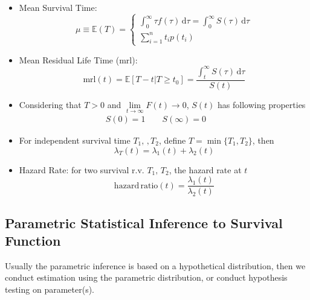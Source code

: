 \begin{itemize}[topsep=2pt,itemsep=0pt]
    \item Mean Survival Time:
    \begin{equation}
        \mu \equiv\mathbb{E}(T)=\begin{cases}
            \int _{0}^\infty \tau f(\tau) \,\mathrm{d}\tau =\int _0^\infty S(\tau) \,\mathrm{d}\tau\\
            \sum_{i=1}^nt_ip(t_i) 
        \end{cases}
    \end{equation}
    
    
    \item Mean Residual Life Time ($ \mathrm{mrl}  $):
    \begin{equation}
        \mathrm{mrl}(t)=\mathbb{E}[T-t|T\geq t_0]=\dfrac{\int _t^\infty S(\tau) \,\mathrm{d}\tau}{S(t)}  
    \end{equation}
    
    \item Considering that $ T>0 $ and $ \lim\limits_{t\to\infty}F(t)\to 0 $, $ S(t) $ has following properties
    \begin{align}
        S(0)=1\qquad S(\infty)=0\qquad
    \end{align}
    \item For independent survival time $ T_1,\,,T_2 $, define $ T=\min\{T_1,T_2\} $, then 
    \begin{equation}
        \lambda _T(t)=\lambda _1(t)+\lambda _2 (t)
    \end{equation}
    \item Hazard Rate: for two survival r.v. $ T_1,\,T_2 $, the hazard rate at $ t $
    \begin{equation}
        \mathrm{hazard\,ratio}(t)=\dfrac{\lambda_1(t) }{\lambda _2(t)}  
    \end{equation}
    
    
\end{itemize}


\subsection{Parametric Statistical Inference to Survival Function}
Usually the parametric inference is based on a hypothetical distribution, then we conduct estimation using the parametric distribution, or conduct hypothesis testing on parameter(s).

